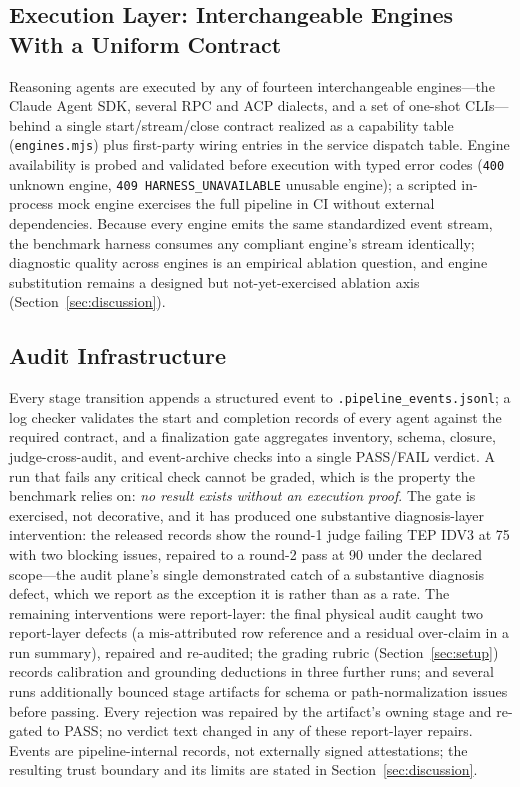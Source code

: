 \documentclass[preprint,10pt]{elsarticle}
\begin{document}
\subsection{Execution Layer: Interchangeable Engines With a Uniform Contract}
Reasoning agents are executed by any of fourteen interchangeable engines---the Claude Agent SDK, several RPC and ACP dialects, and a set of one-shot CLIs---behind a single start/stream/close contract realized as a capability table (\texttt{engines.mjs}) plus first-party wiring entries in the service dispatch table. Engine availability is probed and validated before execution with typed error codes (\texttt{400} unknown engine, \texttt{409 HARNESS\_UNAVAILABLE} unusable engine); a scripted in-process mock engine exercises the full pipeline in CI without external dependencies. Because every engine emits the same standardized event stream, the benchmark harness consumes any compliant engine's stream identically; diagnostic quality across engines is an empirical ablation question, and engine substitution remains a designed but not-yet-exercised ablation axis (Section~\ref{sec:discussion}).

\subsection{Audit Infrastructure}
Every stage transition appends a structured event to \texttt{.pipeline\_\allowbreak events.\allowbreak jsonl}; a log checker validates the start and completion records of every agent against the required contract, and a finalization gate aggregates inventory, schema, closure, judge-cross-audit, and event-archive checks into a single PASS/FAIL verdict. A run that fails any critical check cannot be graded, which is the property the benchmark relies on: \emph{no result exists without an execution proof}. The gate is exercised, not decorative, and it has produced one substantive diagnosis-layer intervention: the released records show the round-1 judge failing TEP IDV3 at 75 with two blocking issues, repaired to a round-2 pass at 90 under the declared scope---the audit plane's single demonstrated catch of a substantive diagnosis defect, which we report as the exception it is rather than as a rate. The remaining interventions were report-layer: the final physical audit caught two report-layer defects (a mis-attributed row reference and a residual over-claim in a run summary), repaired and re-audited; the grading rubric (Section~\ref{sec:setup}) records calibration and grounding deductions in three further runs; and several runs additionally bounced stage artifacts for schema or path-normalization issues before passing. Every rejection was repaired by the artifact's owning stage and re-gated to PASS; no verdict text changed in any of these report-layer repairs. Events are pipeline-internal records, not externally signed attestations; the resulting trust boundary and its limits are stated in Section~\ref{sec:discussion}.
\end{document}
